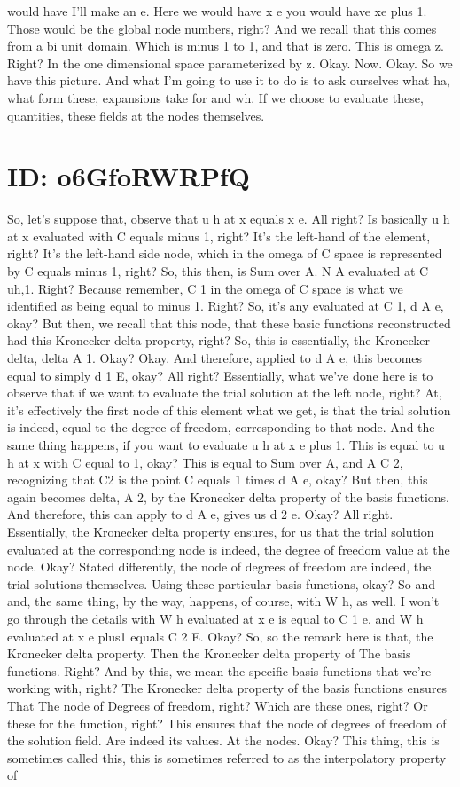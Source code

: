 \documentclass[10pt]{article}
\begin{document}
would have I'll make an e. Here we would have x e you would have xe plus 1. Those would be the global node numbers, right? And we recall that this comes from a bi unit domain. Which is minus 1 to 1, and that is zero. This is omega z. Right? In the one dimensional space parameterized by z. Okay. Now. Okay. So we have this picture. And what I'm going to use it to do is to ask ourselves what ha, what form these, expansions take for and wh. If we choose to evaluate these, quantities, these fields at the nodes themselves.

\section*{ID: o6GfoRWRPfQ}
So, let's suppose that, observe that u h at x equals x e. All right? Is basically u h at x evaluated with C equals minus 1, right? It's the left-hand of the element, right? It's the left-hand side node, which in the omega of C space is represented by C equals minus 1, right? So, this then, is Sum over A. N A evaluated at C uh,1. Right? Because remember, C 1 in the omega of C space is what we identified as being equal to minus 1. Right? So, it's any evaluated at C 1, d A e, okay? But then, we recall that this node, that these basic functions reconstructed had this Kronecker delta property, right? So, this is essentially, the Kronecker delta, delta A 1. Okay? Okay. And therefore, applied to d A e, this becomes equal to simply d 1 E, okay? All right? Essentially, what we've done here is to observe that if we want to evaluate the trial solution at the left node, right? At, it's effectively the first node of this element what we get, is that the trial solution is indeed, equal to the degree of freedom, corresponding to that node. And the same thing happens, if you want to evaluate u h at x e plus 1. This is equal to u h at x with C equal to 1, okay? This is equal to Sum over A, and A C 2, recognizing that C2 is the point C equals 1 times d A e, okay? But then, this again becomes delta, A 2, by the Kronecker delta property of the basis functions.  And therefore, this can apply to d A e, gives us d 2 e. Okay? All right. Essentially, the Kronecker delta property ensures, for us that the trial solution evaluated at the corresponding node is indeed, the degree of freedom value at the node. Okay? Stated differently, the node of degrees of freedom are indeed, the trial solutions themselves. Using these particular basis functions, okay? So and and, the same thing, by the way, happens, of course, with W h, as well. I won't go through the details with W h evaluated at x e is equal to C 1 e, and W h evaluated at x e plus1 equals C 2 E. Okay? So, so the remark here is that, the Kronecker delta property. Then the Kronecker delta property of The basis functions. Right? And by this, we mean the specific basis functions that we're working with, right? The Kronecker delta property of the basis functions ensures That The node of Degrees of freedom, right? Which are these ones, right? Or these for the function, right? This ensures that the node of degrees of freedom of the solution field. Are indeed its values. At the nodes. Okay? This thing, this is sometimes called this, this is sometimes referred to as the interpolatory property of 
\end{document}
